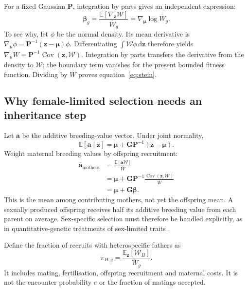 \documentclass[11pt,a4paper]{article}
\newcommand{\E}{\mathbb E}
\newcommand{\Cov}{\operatorname{Cov}}
\newcommand{\dd}{\mathrm d}
\begin{document}
For a fixed Gaussian $\mathbf P$, integration by parts gives an independent expression:
\begin{equation}
\boldsymbol\beta_g
=\frac{\E[\nabla_{\mathbf z}\mathcal W]}{\overline W_g}
=\nabla_{\boldsymbol\mu}\log\overline W_g.
\label{eq:stein}
\end{equation}
To see why, let $\phi$ be the normal density. Its mean derivative is
$\nabla_\mu\phi=\mathbf P^{-1}(\mathbf z-\boldsymbol\mu)\phi$.
Differentiating $\int\mathcal W\phi\,\dd\mathbf z$ therefore yields
$\nabla_\mu\overline W=\mathbf P^{-1}\Cov(\mathbf z,\mathcal W)$.
Integration by parts transfers the derivative from the density to $\mathcal W$; the boundary term vanishes for the present bounded fitness function. Dividing by $\overline W$ proves equation~\eqref{eq:stein}.

\subsection{Why female-limited selection needs an inheritance step}
Let $\mathbf a$ be the additive breeding-value vector. Under joint normality,
\begin{equation}
\E[\mathbf a\mid\mathbf z]
=\boldsymbol\mu+\mathbf G\mathbf P^{-1}(\mathbf z-\boldsymbol\mu).
\end{equation}
Weight maternal breeding values by offspring recruitment:
\begin{align}
\overline{\mathbf a}_{\mathrm{mothers}}
&=\frac{\E[\mathbf a\mathcal W]}{\overline W}\\
&=\boldsymbol\mu+\mathbf G\mathbf P^{-1}
\frac{\Cov(\mathbf z,\mathcal W)}{\overline W}\\
&=\boldsymbol\mu+\mathbf G\boldsymbol\beta.
\label{eq:mothers}
\end{align}
This is the mean among contributing mothers, not yet the offspring mean. A sexually produced offspring receives half its additive breeding value from each parent on average. Sex-specific selection must therefore be handled explicitly, as in quantitative-genetic treatments of sex-limited traits \citep{Lande1980}.

Define the fraction of recruits with heterospecific fathers as
\begin{equation}
\pi_{H,g}=\frac{\E_{\mathbf z}[\mathcal W_H]}{\overline W_g}.
\end{equation}
It includes mating, fertilisation, offspring recruitment and maternal costs. It is not the encounter probability $e$ or the fraction of matings accepted.
\end{document}
